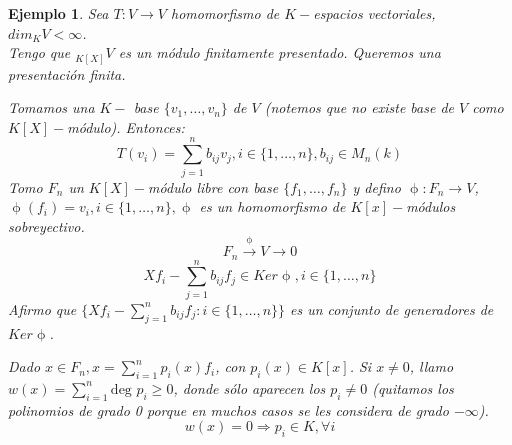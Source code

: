 \documentclass[11pt,a4paper]{article}
\theoremstyle{break}
\newtheorem{example}[theorem]{Ejemplo}
\begin{document}
\begin{example}
Sea $T: V \to V$ homomorfismo de $K-$espacios vectoriales, $dim_{K}V < \infty$. \\
Tengo que $_{K[X]}V$ es un módulo finitamente presentado. Queremos una presentación finita.


Tomamos una $K-$ base $\{v_{1}, \dots, v_{n}\}$ de $V$ (notemos que no existe base de $V$ como $K[X]-$módulo). Entonces:
$$T(v_{i}) = \sum_{j=1}^{n} b_{ij} v_{j}, i \in \{1, \dots, n\}, b_{ij} \in M_{n}(k)$$
Tomo $F_{n}$ un $K[X]-$módulo libre con base $\{f_{1}, \dots, f_{n}\}$ y defino $\upphi: F_{n} \to V$, $\upphi(f_{i}) = v_{i}, i \in \{1, \dots, n\}, \upphi$ es un homomorfismo de $K[x]-$módulos sobreyectivo.
$$F_{n} \overset{\upphi}{\to} V \to 0$$
$$X f_{i} - \sum\limits_{j=1}^{n} b_{ij}f_{j} \in Ker \upphi, i \in \{1, \dots, n\}$$
Afirmo que $\{Xf_{i} - \sum\limits_{j=1}^{n} b_{ij}f_{j}: i \in \{1, \dots, n\}\}$ es un conjunto de generadores de $Ker \upphi$.

Dado $x \in F_{n}, x = \sum\limits_{i=1}^{n} p_{i}(x) f_{i}$, con $p_{i}(x) \in K[x]$. Si $x \neq 0$, llamo $w(x) = \sum\limits_{i=1}^{n} \text{deg } p_{i} \geq 0$, donde sólo aparecen los $p_{i} \neq 0$ (quitamos los polinomios de grado 0 porque en muchos casos se les considera de grado $-\infty$).
$$w(x) = 0 \Rightarrow p_{i} \in K, \forall i$$


\end{example}
\end{document}

